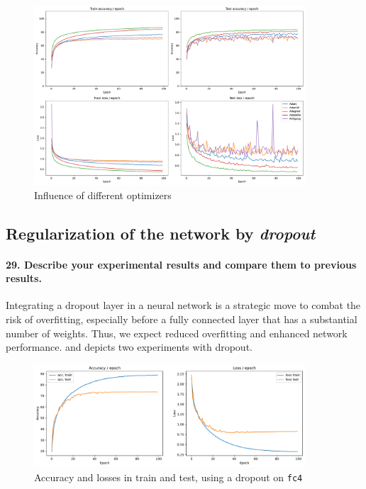 \begin{figure}[H]
    \centering
    \includegraphics*[width=0.9\textwidth]{figs/CNN/optimizers_influence.pdf}
    \caption{Influence of different optimizers}
    \label{fig:optimizers_influence}
\end{figure}

\subsection{Regularization of the network by \textit{dropout}}
\paragraph{29. Describe your experimental results and compare them to previous results.}

Integrating a dropout layer in a neural network is a strategic move to combat the risk of overfitting, especially before a fully connected layer that has a substantial number of weights. Thus, we expect reduced overfitting and enhanced network performance.  and  depicts two experiments with dropout.

\begin{figure}[H]
    \centering
    \includegraphics*[width=0.9\textwidth]{figs/CNN/dropout.pdf}
    \caption{Accuracy and losses in train and test, using a dropout on \texttt{fc4}}
    \label{fig:dropout}
\end{figure}

